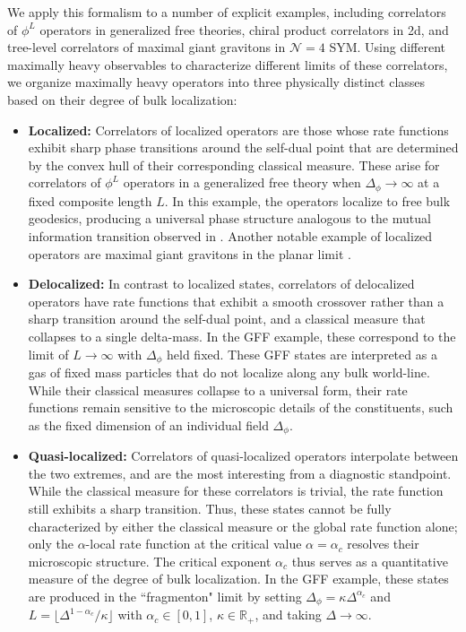 \documentclass[a4paper,11pt]{article}
\theoremstyle{plain}
\theoremstyle{definition}
\theoremstyle{remark}
\newcommand{\Df}{\Delta_\phi}
\newcommand{\De}{\Delta}
\begin{document}
We apply this formalism to a number of explicit examples, including correlators of $\phi^L$ operators in generalized free theories, chiral product correlators in 2d, and tree-level correlators of maximal giant gravitons in $\mathcal{N} = 4$ SYM. Using different maximally heavy observables to characterize different limits of these correlators, we organize maximally heavy operators into three physically distinct classes based on their degree of bulk localization:
\begin{itemize}[leftmargin=*]
\item {\bf Localized:} Correlators of localized operators are those whose rate functions exhibit sharp phase transitions around the self-dual point that are determined by the convex hull of their corresponding classical measure. These arise for correlators of $\phi^L$ operators in a generalized free theory when $\Df \to \infty$ at a fixed composite length $L$. In this example, the operators localize to free bulk geodesics, producing a universal phase structure analogous to the mutual information transition observed in \cite{Ceyhan:2025qrj}. Another notable example of localized operators are maximal giant gravitons in the planar limit \cite{Vescovi:2021fjf}.
\item {\bf Delocalized:} In contrast to localized states, correlators of delocalized operators have rate functions that exhibit a smooth crossover rather than a sharp transition around the self-dual point, and a classical measure that collapses to a single delta-mass. In the GFF example, these correspond to the limit of $L \to \infty$ with $\Df$ held fixed. These GFF states are interpreted as a gas of fixed mass particles that do not localize along any bulk world-line. While their classical measures collapse to a universal form, their rate functions remain sensitive to the microscopic details of the constituents, such as the fixed dimension of an individual field $\Df$.

\item {\bf Quasi-localized:} Correlators of quasi-localized operators interpolate between the two extremes, and are the most interesting from a diagnostic standpoint. While the classical measure for these correlators is trivial, the rate function still exhibits a sharp transition. Thus, these states cannot be fully characterized by either the classical measure or the global rate function alone; only the $\alpha$-local rate function at the critical value $\alpha = \alpha_c$ resolves their microscopic structure. The critical exponent $\alpha_c$ thus serves as a quantitative measure of the degree of bulk localization. In the GFF example, these states are produced in the ``fragmenton" limit by setting $\Df = \kappa \De^{\alpha_c}$ and $L = \lfloor \De^{1-\alpha_c } / \kappa\rfloor$ with $\alpha_c \in [0,1]$, $\kappa \in \mathbb{R}_+$, and taking $\De \to \infty$.
\end{itemize}
\end{document}
